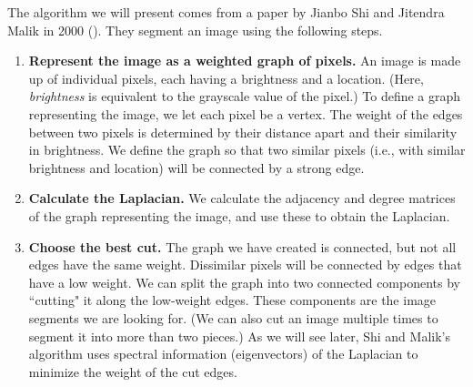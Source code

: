 The algorithm we will present comes from a paper by Jianbo Shi and Jitendra Malik in 2000 (\cite{Shi2000}).
They segment an image using the following steps.
\begin{enumerate}
	\item \textbf{Represent the image as a weighted graph of pixels.} 
An image is made up of individual pixels, each having a brightness and a location.
(Here, \emph{brightness} is equivalent to the grayscale value of the pixel.)
To define a graph representing the image, we let each pixel be a vertex.
The weight of the edges between two pixels is determined by their distance apart and their similarity in brightness.
We define the graph so that two similar pixels (i.e., with similar brightness and location) will be connected by a strong edge.
	\item \textbf{Calculate the Laplacian.} 
We calculate the adjacency and degree matrices of the graph representing the image, and use these to obtain the Laplacian.
	\item \textbf{Choose the best cut.} 
The graph we have created is connected, but not all edges have the same weight.
Dissimilar pixels will be connected by edges that have a low weight.
We can split the graph into two connected components by ``cutting" it along the low-weight edges.
These components are the image segments we are looking for.
(We can also cut an image multiple times to segment it into more than two pieces.)
As we will see later, Shi and Malik's algorithm uses spectral information (eigenvectors) of the Laplacian to minimize the weight of the cut edges.
\end{enumerate}

